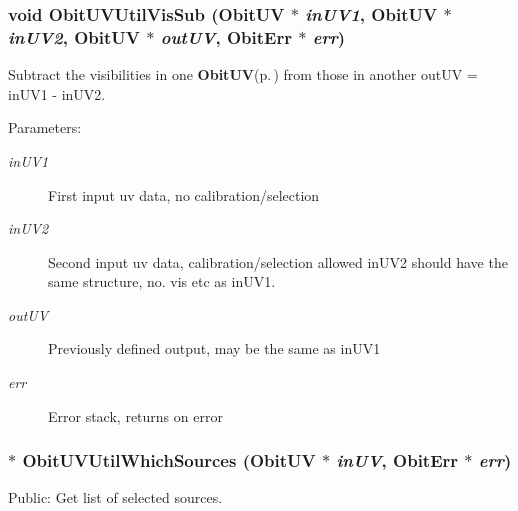 \subsubsection{\setlength{\rightskip}{0pt plus 5cm}void Obit\-UVUtil\-Vis\-Sub ({\bf Obit\-UV} $\ast$ {\em in\-UV1}, {\bf Obit\-UV} $\ast$ {\em in\-UV2}, {\bf Obit\-UV} $\ast$ {\em out\-UV}, {\bf Obit\-Err} $\ast$ {\em err})\hspace{0.3cm}{\tt  [related]}}\label{ObitUVUtil_8c_a7}


Subtract the visibilities in one {\bf Obit\-UV}{\rm (p.\,\pageref{structObitUV})} from those in another out\-UV = in\-UV1 - in\-UV2. 

\begin{Desc}
\item[Parameters:]
\begin{description}
\item[{\em in\-UV1}]First input uv data, no calibration/selection \item[{\em in\-UV2}]Second input uv data, calibration/selection allowed in\-UV2 should have the same structure, no. vis etc as in\-UV1. \item[{\em out\-UV}]Previously defined output, may be the same as in\-UV1 \item[{\em err}]Error stack, returns on error \end{description}
\end{Desc}
\subsubsection{$\ast$ Obit\-UVUtil\-Which\-Sources ({\bf Obit\-UV} $\ast$ {\em in\-UV}, {\bf Obit\-Err} $\ast$ {\em err})}\label{ObitUVUtil_8c_a10}


Public: Get list of selected sources. 

